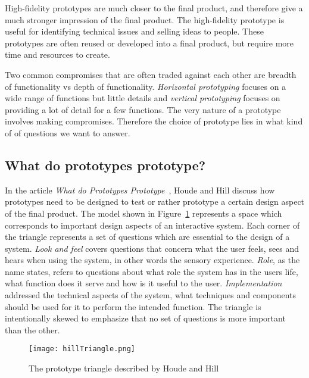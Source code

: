 High-fidelity prototypes are much closer to the final product, and therefore give a much stronger impression of the final product. The high-fidelity prototype is useful for identifying technical issues and selling ideas to people. These prototypes are often reused or developed into a final product, but require more time and resources to create.

Two common compromises that are often traded against each other are breadth of functionality vs depth of functionality. \textit{Horizontal prototyping} focuses on a wide range of functions but little details and \textit{vertical prototyping} focuses on providing a lot of detail for a few functions. The very nature of a prototype involves making compromises. Therefore the choice of prototype lies in what kind of of questions we want to answer. 

\subsection{What do prototypes prototype?}
\label{sec:prototypesPrototype}
In the article \textit{What do Prototypes Prototype}~\cite{prototypesPrototype}, Houde and Hill discuss how prototypes need to be designed to test or rather prototype a certain design aspect of the final product. The model shown in Figure~\ref{fig:hillTriangle} represents a space which corresponds to important design aspects of an interactive system. Each corner of the triangle represents a set of questions which are essential to the design of a system. \textit{Look and feel} covers questions that concern what the user feels, sees and hears when using the system, in other words the sensory experience. \textit{Role}, as the name states, refers to questions about what role the system has in the users life, what function does it serve and how is it useful to the user. \textit{Implementation} addressed the technical aspects of the system, what techniques and components should be used for it to perform the intended function. The triangle is intentionally skewed to emphasize that no set of questions is more important than the other.

\begin{figure}[h!]
	\centering
		\texttt{[image: hillTriangle.png]}
		\caption[Prototype triangle]{The prototype triangle described by Houde and Hill~\cite{prototypesPrototype}}
		\label{fig:hillTriangle}
\end{figure}

